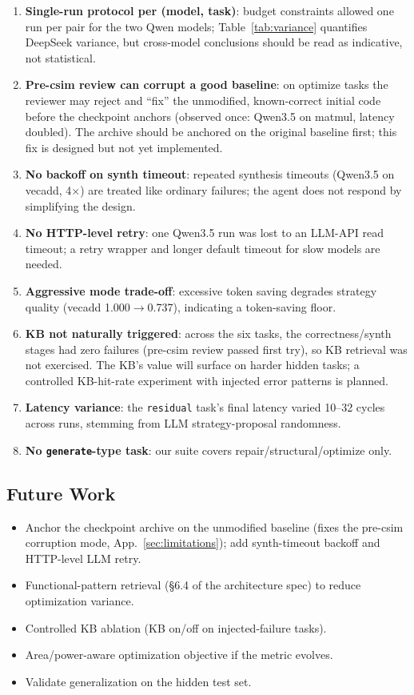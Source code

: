 \documentclass[10pt,conference,letterpaper]{IEEEtran}
\begin{document}
\begin{enumerate}
    \item \textbf{Single-run protocol per (model, task)}: budget constraints allowed one run per pair for the two Qwen models; Table~\ref{tab:variance} quantifies DeepSeek variance, but cross-model conclusions should be read as indicative, not statistical.
    \item \textbf{Pre-csim review can corrupt a good baseline}: on optimize tasks the reviewer may reject and ``fix'' the unmodified, known-correct initial code before the checkpoint anchors (observed once: Qwen3.5 on matmul, latency doubled). The archive should be anchored on the original baseline first; this fix is designed but not yet implemented.
    \item \textbf{No backoff on synth timeout}: repeated synthesis timeouts (Qwen3.5 on vecadd, 4$\times$) are treated like ordinary failures; the agent does not respond by simplifying the design.
    \item \textbf{No HTTP-level retry}: one Qwen3.5 run was lost to an LLM-API read timeout; a retry wrapper and longer default timeout for slow models are needed.
    \item \textbf{Aggressive mode trade-off}: excessive token saving degrades strategy quality (vecadd 1.000$\to$0.737), indicating a token-saving floor.
    \item \textbf{KB not naturally triggered}: across the six tasks, the correctness/synth stages had zero failures (pre-csim review passed first try), so KB retrieval was not exercised. The KB's value will surface on harder hidden tasks; a controlled KB-hit-rate experiment with injected error patterns is planned.
    \item \textbf{Latency variance}: the \texttt{residual} task's final latency varied 10--32 cycles across runs, stemming from LLM strategy-proposal randomness.
    \item \textbf{No \texttt{generate}-type task}: our suite covers repair/structural/optimize only.
\end{enumerate}

\subsection{Future Work}

\begin{itemize}
    \item Anchor the checkpoint archive on the unmodified baseline (fixes the pre-csim corruption mode, App.~\ref{sec:limitations}); add synth-timeout backoff and HTTP-level LLM retry.
    \item Functional-pattern retrieval (\S6.4 of the architecture spec) to reduce optimization variance.
    \item Controlled KB ablation (KB on/off on injected-failure tasks).
    \item Area/power-aware optimization objective if the metric evolves.
    \item Validate generalization on the hidden test set.
\end{itemize}
\end{document}
